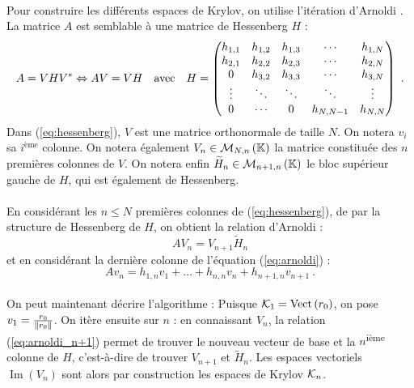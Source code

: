 		\paragraph{}
		Pour construire les différents espaces de Krylov, on utilise l'itération d'Arnoldi \cite{TrefethenBau1997}.
		La matrice $A$ est semblable à une matrice de Hessenberg $H$ :
		\begin{equation}\label{eq:hessenberg}
			A = VH{V}^*\Leftrightarrow AV = VH\quad\textrm{avec}\quad H=
			\begin{pmatrix}
				h_{1,1}&h_{1,2}&h_{1,3}&\cdots &h_{1,N}\\
				h_{2,1}&h_{2,2}&h_{2,3}&\cdots &h_{2,N}\\
				0      &h_{3,2}&h_{3,3}&\cdots &h_{3,N}\\
				\vdots &\ddots &\ddots &\ddots &\vdots \\
				0      &\cdots &0      &h_{N,N-1}&h_{N,N}
			\end{pmatrix}\ .
		\end{equation}
		Dans (\ref{eq:hessenberg}), $V$ est une matrice orthonormale de taille $N$.
		On notera $v_i$ sa $i^{\textrm{ème}}$ colonne.
		On notera également $V_n\in\mathcal{M}_{N, n}\left(\mathbb{K}\right)$ la matrice constituée des $n$ premières colonnes de $V$.
		On notera enfin $\widetilde{H}_n\in\mathcal{M}_{n+1, n}\left(\mathbb{K}\right)$ le bloc supérieur gauche de $H$, qui est également de Hessenberg.

		\paragraph{}
		En considérant les $n \le N$ premières colonnes de (\ref{eq:hessenberg}), de par la structure de Hessenberg de $H$, on obtient la relation d'Arnoldi :
		\begin{equation}\label{eq:arnoldi}
			AV_n = V_{n+1}\widetilde{H}_n
		\end{equation}
		et en considérant la dernière colonne de l'équation (\ref{eq:arnoldi}) :
		\begin{equation}\label{eq:arnoldi_n+1}
			Av_n = h_{1,n}v_1 + \dots + h_{n,n}v_n + h_{n+1,n}v_{n+1}\ .
		\end{equation}

		\paragraph{}
		On peut maintenant décrire l'algorithme :
		Puisque $\krylov{1} = \operatorname{Vect}\left(r_0\right)$, on pose $v_1 = \frac{r_0}{\norm{r_0}}$.
		On itère ensuite sur $n$ : en connaissant $V_n$, la relation (\ref{eq:arnoldi_n+1}) permet de trouver le nouveau vecteur de base et la $n$\textsuperscript{ième} colonne de $H$, c'est-à-dire de trouver $V_{n+1}$ et $\widetilde{H}_n$.
		Les espaces vectoriels $\operatorname{Im}\left(V_n\right)$ sont alors par construction les espaces de Krylov $\krylov{n}$.

